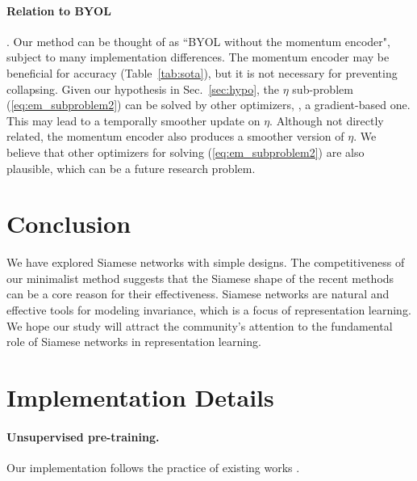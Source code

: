 \documentclass[final]{cvpr}
\begin{document}
\paragraph{Relation to BYOL} \cite{Grill2020}. Our method can be thought of as ``BYOL without the momentum encoder", subject to many implementation differences. The momentum encoder may be beneficial for accuracy (Table~\ref{tab:sota}), but it is not necessary for preventing collapsing.
Given our hypothesis in Sec.~\ref{sec:hypo}, the $\eta$ sub-problem (\ref{eq:em_subproblem2}) can be solved by other optimizers, \eg, a gradient-based one. This may lead to a temporally smoother update on $\eta$. 
Although not directly related, the momentum encoder also produces a smoother version of $\eta$. We believe that other optimizers for solving (\ref{eq:em_subproblem2}) are also plausible, which can be a future research problem.

\section{Conclusion\label{sec:conc}}

We have explored Siamese networks with simple designs. The competitiveness of our minimalist method suggests that the Siamese shape of the recent methods can be a core reason for their effectiveness. Siamese networks are natural and effective tools for modeling invariance, which is a focus of representation learning. We hope our study will attract the community's attention to the fundamental role of Siamese networks in representation learning.

{\small
{}
\renewcommand\UrlFont{\color{Gray}\rmfamily}


}

\newpage

\renewcommand\thefigure{\thesection.\arabic{figure}}
\renewcommand\thetable{\thesection.\arabic{table}}
\setcounter{figure}{0} 
\setcounter{table}{0} 

\appendix

\section{Implementation Details}

\paragraph{Unsupervised pre-training.} Our implementation follows the practice of existing works \cite{Wu2018a,He2019a,Chen2020,Chen2020a,Grill2020}.
\end{document}
